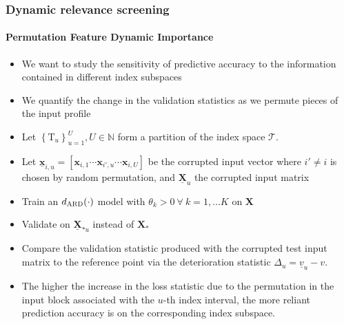\documentclass{snedecorbeamer}
\begin{document}
\begin{frame}%
  \label{frm:pdfi}
  \frametitle{Dynamic relevance screening}
  \framesubtitle{Permutation Feature Dynamic Importance}

  \begin{itemize}
  \item We want to study the sensitivity of predictive accuracy to the
    information contained in different index subspaces
  \item We quantify the change in the validation statistics as we permute pieces
    of the input profile
  \item Let
    $\left\{\mathrm{T}_u\right\}_{u=1}^{U}, U \in \mathbb{N}$ form a
    partition of the index space $\mathcal{T}$.
  \item Let $\underline{\mathbf{x}}_{i,u} = [\mathbf{x}_{i,1}\cdots
    \mathbf{x}_{i',u}\cdots\mathbf{x}_{i,U}]$ be the corrupted input vector
    where $i' \ne i$ is chosen by random permutation, and
    $\underline{\mathbf{X}}_u$ the corrupted input matrix
  \item Train an $d_{\textsc{ARD}}(\cdot)$ model with $\theta_k > 0 \
    \forall \ k = 1, \dots K$ on $\mathbf{X}$
  \item Validate on
    $\underline{\mathbf{X}}_{*u}$ instead of $\mathbf{X}_{*}$
  \item Compare the validation statistic
    produced with the corrupted test input matrix to the
    reference point via the deterioration statistic $\Delta_{u} =
    \underline{v}_{u} - v$.
  \item The higher the increase in the loss statistic due to the permutation
    in the input block associated with the $u$-th index interval, the more
    reliant prediction accuracy is on the corresponding index
    subspace.
  \end{itemize}
\end{frame}
\end{document}
